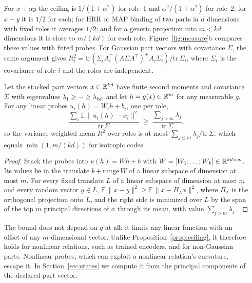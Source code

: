 \noindent
For $x + \alpha y$ the ceiling is $1/(1 + \alpha^2)$ for role~1 and $\alpha^2/(1 + \alpha^2)$ for role~2; for $x + y$ it is $1/2$ for each; for HRR or MAP binding of two parts in $d$ dimensions with fixed roles it averages $1/2$; and for a generic projection into $m < kd$ dimensions it is close to $m/(kd)$ for each role. Figure~\ref{fig:measure}b compares these values with fitted probes. For Gaussian part vectors with covariance $\Sigma$, the same argument gives $R^2_i = \mathrm{tr}(\Sigma_i A_i^{\top}(A\Sigma A^{\top})^{+}A_i\Sigma_i)/\mathrm{tr}\,\Sigma_i$, where $\Sigma_i$ is the covariance of role $i$ and the roles are independent.

\begin{proposition}
\label{prop:ey}
Let the stacked part vectors $x \in \mathbb{R}^{kd}$ have finite second moments and covariance $\Sigma$ with eigenvalues $\lambda_1 \ge \cdots \ge \lambda_{kd}$, and let $h = g(x) \in \mathbb{R}^m$ for any measurable $g$. For any linear probes $u_i(h) = W_i h + b_i$, one per role,
\begin{equation}
  \frac{\sum_i \mathbb{E}\,\lVert u_i(h) - x_i \rVert^2}{\mathrm{tr}\,\Sigma} \;\ge\; \frac{\sum_{j > m} \lambda_j}{\mathrm{tr}\,\Sigma},
\end{equation}
so the variance-weighted mean $R^2$ over roles is at most $\sum_{j \le m} \lambda_j / \mathrm{tr}\,\Sigma$, which equals $\min(1, m/(kd))$ for isotropic codes.
\end{proposition}

\begin{proof}
Stack the probes into $u(h) = Wh + b$ with $W = [W_1; \ldots; W_k] \in \mathbb{R}^{kd \times m}$. Its values lie in the translate $b + \mathrm{range}\,W$ of a linear subspace of dimension at most $m$. For every fixed translate $L$ of a linear subspace of dimension at most $m$ and every random vector $y \in L$, $\mathbb{E}\,\lVert x - y \rVert^2 \ge \mathbb{E}\,\lVert x - \Pi_L x \rVert^2$, where $\Pi_L$ is the orthogonal projection onto $L$, and the right side is minimized over $L$ by the span of the top $m$ principal directions of $x$ through its mean, with value $\sum_{j > m} \lambda_j$ \citep{eckart1936}.
\end{proof}

\noindent
The bound does not depend on $g$ at all: it limits any linear function with an offset of any $m$-dimensional vector. Unlike Proposition~\ref{prop:ceiling}, it therefore holds for nonlinear relations, such as trained encoders, and for non-Gaussian parts. Nonlinear probes, which can exploit a nonlinear relation's curvature, escape it. In Section~\ref{sec:states} we compute it from the principal components of the declared part vector.

